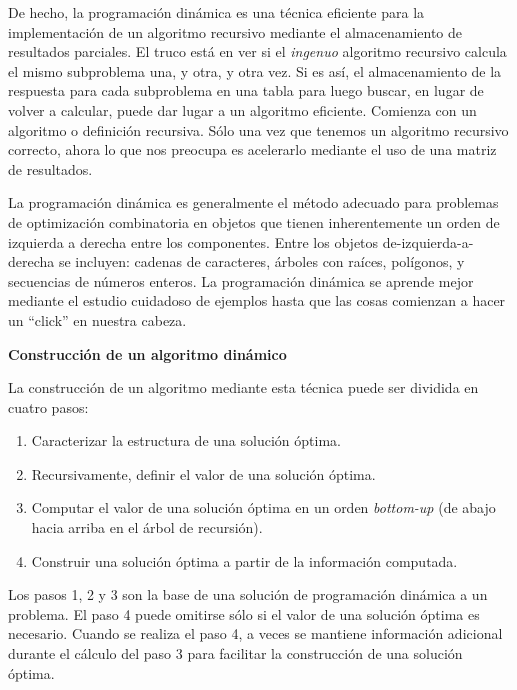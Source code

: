 De hecho, la programación dinámica es una técnica eficiente para la implementación de un algoritmo recursivo mediante el almacenamiento de
resultados parciales. El truco está en ver si el \textit{ingenuo} algoritmo recursivo calcula el mismo subproblema una, y otra, y otra vez.
Si es así, el almacenamiento de la respuesta para cada subproblema en una tabla para luego buscar, en lugar de volver a calcular, puede dar
lugar a un algoritmo eficiente. Comienza con un algoritmo o definición recursiva. Sólo una vez que tenemos un algoritmo recursivo correcto,
ahora lo que nos preocupa es acelerarlo mediante el uso de una matriz de resultados.

La programación dinámica es generalmente el método adecuado para problemas de optimización combinatoria en objetos que tienen inherentemente
un orden de izquierda a derecha entre los componentes. Entre los objetos de-izquierda-a-derecha se incluyen: cadenas de caracteres, árboles
con raíces, polígonos, y secuencias de números enteros. La programación dinámica se aprende mejor mediante el estudio cuidadoso de ejemplos
hasta que las cosas comienzan a hacer un ``click'' en nuestra cabeza\cite{skiena08}\cite{moshe10}.\\


\begin{flushleft}
    \textbf{Construcción de un algoritmo dinámico}
\end{flushleft}
La construcción de un algoritmo mediante esta técnica puede ser dividida en cuatro pasos:
\begin{enumerate}
    \item   Caracterizar la estructura de una solución óptima. 
    \item   Recursivamente, definir el valor de una solución óptima.
    \item   Computar el valor de una solución óptima en un orden \textit{bottom-up} (de abajo hacia arriba en el árbol de recursión).
    \item   Construir una solución óptima a partir de la información computada.
\end{enumerate}
Los pasos 1, 2 y 3 son la base de una solución de programación dinámica a un problema. El paso 4 puede omitirse sólo si el valor de una
solución óptima es necesario. Cuando se realiza el paso 4, a veces se mantiene información adicional durante el cálculo del paso 3 para
facilitar la construcción de una solución óptima\cite{cormen09}.\\

